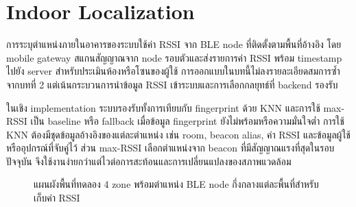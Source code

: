 \section{Indoor Localization}
\label{sec:ch3_localization}
การระบุตำแหน่งภายในอาคารของระบบใช้ค่า RSSI จาก BLE node ที่ติดตั้งตามพื้นที่อ้างอิง โดย mobile gateway สแกนสัญญาณจาก node รอบตัวและส่งรายการค่า RSSI พร้อม timestamp ไปยัง server สำหรับประเมินห้องหรือโซนของผู้ใช้ การออกแบบในบทนี้ไม่ลงรายละเอียดสมการซ้ำจากบทที่ 2 แต่เน้นกระบวนการนำข้อมูล RSSI เข้าระบบและการเลือกกลยุทธ์ที่ backend รองรับ

ในเชิง implementation ระบบรองรับทั้งการเทียบกับ fingerprint ด้วย KNN และการใช้ max-RSSI เป็น baseline หรือ fallback เมื่อข้อมูล fingerprint ยังไม่พร้อมหรือความมั่นใจต่ำ การใช้ KNN ต้องมีชุดข้อมูลอ้างอิงของแต่ละตำแหน่ง เช่น room, beacon alias, ค่า RSSI และข้อมูลผู้ใช้หรืออุปกรณ์ที่จับคู่ไว้ ส่วน max-RSSI เลือกตำแหน่งจาก beacon ที่มีสัญญาณแรงที่สุดในรอบปัจจุบัน จึงใช้งานง่ายกว่าแต่ไวต่อการสะท้อนและการเปลี่ยนแปลงของสภาพแวดล้อม

\begin{figure}[H]
    \centering
    \caption{แผนผังพื้นที่ทดลอง 4 zone พร้อมตำแหน่ง BLE node กึ่งกลางแต่ละพื้นที่สำหรับเก็บค่า RSSI}
    \label{fig:ch3-beacon-layout}
\end{figure}

